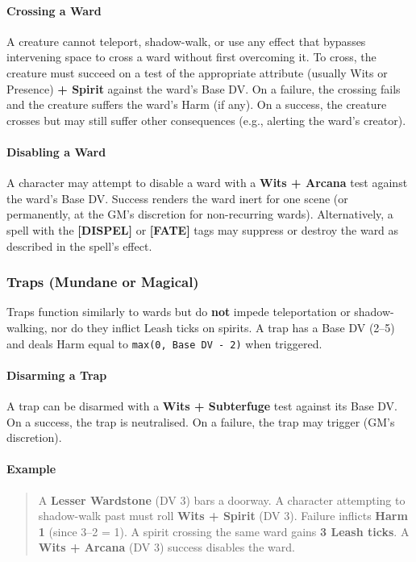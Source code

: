 \paragraph{Crossing a Ward}
A creature cannot teleport, shadow-walk, or use any effect that bypasses intervening space to cross a ward without first overcoming it. To cross, the creature must succeed on a test of the appropriate attribute (usually Wits or Presence) \textbf{+ Spirit} against the ward's Base DV. On a failure, the crossing fails and the creature suffers the ward's Harm (if any). On a success, the creature crosses but may still suffer other consequences (e.g., alerting the ward's creator).

\paragraph{Disabling a Ward}
A character may attempt to disable a ward with a \textbf{Wits + Arcana} test against the ward's Base DV. Success renders the ward inert for one scene (or permanently, at the GM's discretion for non-recurring wards). Alternatively, a spell with the \textbf{[DISPEL]} or \textbf{[FATE]} tags may suppress or destroy the ward as described in the spell's effect.

\subsubsection{Traps (Mundane or Magical)}

Traps function similarly to wards but do \textbf{not} impede teleportation or shadow-walking, nor do they inflict Leash ticks on spirits. A trap has a Base DV (2--5) and deals Harm equal to \texttt{max(0, Base DV - 2)} when triggered.

\paragraph{Disarming a Trap}
A trap can be disarmed with a \textbf{Wits + Subterfuge} test against its Base DV. On a success, the trap is neutralised. On a failure, the trap may trigger (GM's discretion).

\paragraph{Example}
\begin{quote}
    A \textbf{Lesser Wardstone} (DV 3) bars a doorway. A character attempting to shadow-walk past must roll \textbf{Wits + Spirit} (DV 3). Failure inflicts \textbf{Harm 1} (since 3--2 = 1). A spirit crossing the same ward gains \textbf{3 Leash ticks}. A \textbf{Wits + Arcana} (DV 3) success disables the ward.
\end{quote}